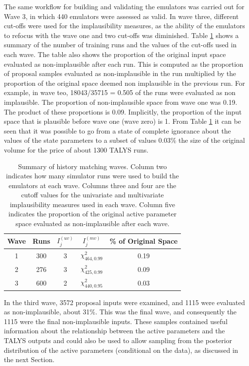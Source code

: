 \documentclass[
  12pt,
  a4paper,
  twoside]{book}
\begin{document}
The same workflow for building and validating the emulators was carried out for Wave 3, in which 440 emulators were assessed as valid. In wave three, different cut-offs were used for the implausibility measures, as the ability of the emulators to refocus with the wave one and two cut-offs was diminished. Table \ref{tab:hm-summary} shows a summary of the number of training runs and the values of the cut-offs used in each wave. The table also shows the proportion of the original input space evaluated as non-implausible after each run. This is computed as the proportion of proposal samples evaluated as non-implausible in the run multiplied by the proportion of the original space deemed non implausible in the previous run. For example, in wave teo, 18043/35715 = 0.505 of the runs were evaluated as non implausible. The proportion of non-implausible space from wave one was 0.19. The product of these proportions is 0.09. Implicitly, the proportion of the input space that is plausible before wave one (wave zero) is 1. From Table \ref{tab:hm-summary} it can be seen that it was possible to go from a state of complete ignorance about the values of the state parameters to a subset of values 0.03\% the size of the original volume for the price of about 1300 TALYS runs.

\begin{table}\centering
\label{tab:hm-summary}
\caption{Summary of history matching waves. Column two indicates how many simulator runs were used to build the emulators at each wave. Columns three and four are the cutoff values for the univariate and multivariate implausibility measures used in each wave. Column five indicates the proportion of the original active parameter space evaluated as non-implausible after each wave.}
\begin{tabular}{ccccc}\\
Wave & Runs &$I_j^{(uv)}$&$I_j^{(mv)}$& \% of Original Space \\
\hline
1 & 300 & 3 & $\chi^2_{464,0.99}$ & 0.19 \\
2 & 276 & 3 & $\chi^2_{425,0.99}$ &  0.09 \\
3 & 600 & 2 & $\chi^2_{440,0.95}$ & 0.03 \\
\hline
\end{tabular}
\end{table}

In the third wave, 3572 proposal inputs were examined, and 1115 were evaluated as non-implausible, about 31\%. This was the final wave, and consequently the 1115 were the final non-implausible inputs. These samples contained useful information about the relationship between the active parameters and the TALYS outputs and could also be used to allow sampling from the posterior distribution of the active parameters (conditional on the data), as discussed in the next Section.
\end{document}
